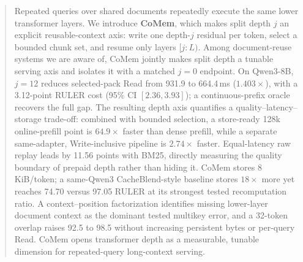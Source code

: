 \begin{abstract}
Repeated queries over shared documents repeatedly execute the same lower
transformer layers. We introduce \textbf{CoMem}, which makes split depth $j$ an
explicit reusable-context axis: write one depth-$j$ residual per token, select a
bounded chunk set, and resume only layers $[j{:}L)$. Among document-reuse
systems we are aware of, CoMem jointly makes split depth a tunable serving axis
and isolates it with a matched $j{=}0$ endpoint. On Qwen3-8B, $j{=}12$ reduces
selected-pack Read from 931.9 to 664.4\,ms ($1.403\times$), with a 3.12-point
RULER cost (95\% CI $[2.36,3.93]$); a continuous-prefix oracle recovers the full
gap. The resulting depth axis quantifies a quality--latency--storage trade-off:
combined with bounded selection, a store-ready 128k online-prefill point is
$64.9\times$ faster than dense prefill, while a separate same-adapter,
Write-inclusive pipeline is $2.74\times$ faster. Equal-latency raw replay leads
by 11.56 points with BM25, directly measuring the quality boundary of prepaid
depth rather than hiding it. CoMem stores 8\,KiB/token; a same-Qwen3
CacheBlend-style baseline stores $18\times$ more yet reaches 74.70 versus 97.05
RULER at its strongest tested recomputation ratio. A context--position
factorization identifies missing lower-layer document context as the dominant
tested multikey error, and a 32-token overlap raises 92.5 to 98.5 without
increasing persistent bytes or per-query Read. CoMem opens transformer depth as
a measurable, tunable dimension for repeated-query long-context serving.
\end{abstract}
